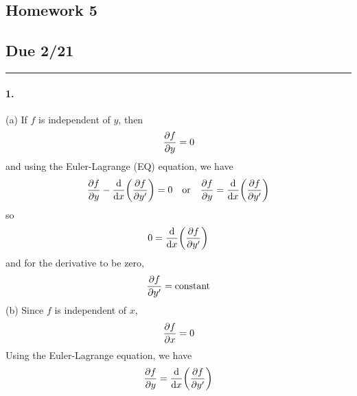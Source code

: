 \documentclass[../hw.tex]{subfiles}
\begin{document}
\setcounter{section}{5}
\begin{center}
  \section*{Homework 5} \label{sec:homework5}
  \subsection*{Due 2/21}
\end{center}
\hrule \vspace{10px}

\paragraph*{1.} (a) If $f$ is independent of $y$, then 
\begin{align*}
    \pdv{f}{y} = 0
\end{align*}
and using the Euler-Lagrange (EQ) equation, we have
\begin{align*}
    \pdv{f}{y} - \dv{x}(\pdv{f}{y'}) = 0 \qor \pdv{f}{y} = \dv{x}(\pdv{f}{y'})
\end{align*}
so
\begin{align*}
    0 = \dv{x}(\pdv{f}{y'})
\end{align*}
and for the derivative to be zero,
\begin{align*}
    \pdv{f}{y'} = \mathrm{constant}
\end{align*}
(b) Since $f$ is independent of $x$,
\begin{align*}
    \pdv{f}{x} = 0
\end{align*}
Using the Euler-Lagrange equation, we have
\begin{align*}
    \pdv{f}{y} = \dv{x}(\pdv{f}{y'})
\end{align*}
\end{document}
